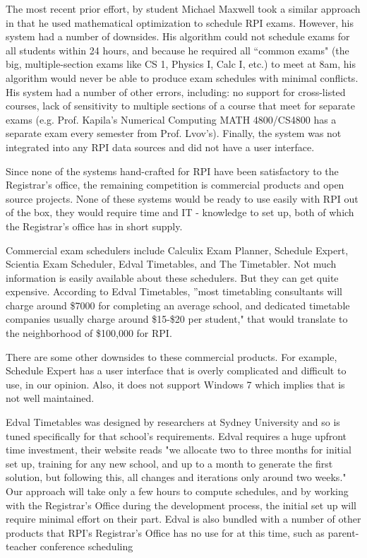 \documentclass[11pt]{article}
\begin{document}
The most recent prior effort, by student Michael Maxwell took a similar approach in that he used mathematical optimization to schedule RPI exams. 
However, his system had a number of downsides. His algorithm could not schedule exams for all students within 24 hours, and because he required all ``common exams" (the big, multiple-section exams like CS 1, Physics I, Calc I, etc.) to meet at 8am, his algorithm would never be able to produce exam schedules with minimal conflicts. His system had a number of other errors, including: no support for cross-listed courses, lack of sensitivity to multiple sections of a course that meet for separate exams (e.g. Prof. Kapila's Numerical Computing MATH 4800/CS4800 has a separate exam every semester from Prof. Lvov's).  Finally, the system was not integrated into any RPI data sources and did not have a user interface. 

Since none of the systems hand-crafted for RPI have been satisfactory to the Registrar's office, the remaining competition is commercial products and open source projects. None of these systems would be ready to use easily with RPI out of the box, they would require time and IT - knowledge to set up, both of which the Registrar's office has in short supply. 

Commercial exam schedulers include Calculix Exam Planner, Schedule Expert, Scientia Exam Scheduler, Edval Timetables, and The Timetabler. Not much information is easily available about these schedulers.  But they can get quite expensive. According to Edval Timetables, ''most timetabling consultants will charge around \$7000 for completing an average school, and dedicated timetable companies usually charge around \$15-\$20 per student," that would translate to the neighborhood of \$100,000 for RPI.

There are some other downsides to these commercial products.
For example, Schedule Expert has a user interface that is overly complicated and difficult to use, in our opinion.  Also, it does not support Windows 7 which implies that is not well maintained.

Edval Timetables was designed by researchers at Sydney University and so is tuned specifically for that school's requirements. Edval requires a huge upfront time investment, their website reads "we allocate two to three months for initial set up, training for any new school, and up to a month to generate the first solution, but following this, all changes and iterations only around two weeks."  Our approach will take only a few hours to compute schedules, and by working with the Registrar's Office during the development process, the initial set up will require minimal effort on their part. Edval is also bundled with a number of other products that RPI's Registrar's Office has no use for at this time, such as parent-teacher conference scheduling 
\end{document}
